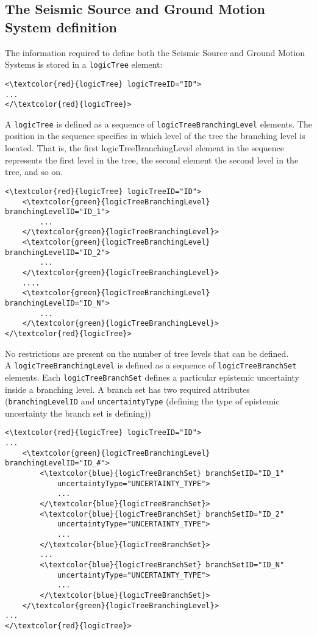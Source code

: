 \subsection{The Seismic Source and Ground Motion System definition}
The information required to define both the Seismic Source and Ground Motion Systems is stored in a \Verb+logicTree+ element: 
\begin{Verbatim}[frame=single, commandchars=\\\{\}]
<\textcolor{red}{logicTree} logicTreeID="ID">
...
</\textcolor{red}{logicTree}>
\end{Verbatim}
A \Verb+logicTree+ is defined as a sequence of \Verb+logicTreeBranchingLevel+ elements. The position in the sequence specifies in which level of the tree the branching level is located. That is, the first logicTreeBranchingLevel element in the sequence represents the first level in the tree, the second element the second level in the tree, and so on.
\begin{Verbatim}[frame=single, commandchars=\\\{\}]
<\textcolor{red}{logicTree} logicTreeID="ID">
	<\textcolor{green}{logicTreeBranchingLevel} branchingLevelID="ID_1">
		...
	</\textcolor{green}{logicTreeBranchingLevel}>
	<\textcolor{green}{logicTreeBranchingLevel} branchingLevelID="ID_2">
		...
	</\textcolor{green}{logicTreeBranchingLevel}>
	....
	<\textcolor{green}{logicTreeBranchingLevel} branchingLevelID="ID_N">
		...
	</\textcolor{green}{logicTreeBranchingLevel}>
</\textcolor{red}{logicTree}>
\end{Verbatim}
No restrictions are present on the number of tree levels that can be defined.\\
A \Verb+logicTreeBranchingLevel+ is defined as a sequence of \Verb+logicTreeBranchSet+ elements. Each \Verb+logicTreeBranchSet+ defines a particular epistemic uncertainty inside a branching level. A branch set has two required attributes (\Verb+branchingLevelID+ and \Verb+uncertaintyType+ (defining the type of epistemic uncertainty the branch set is defining))
\begin{Verbatim}[frame=single, commandchars=\\\{\}]
<\textcolor{red}{logicTree} logicTreeID="ID">
...
	<\textcolor{green}{logicTreeBranchingLevel} branchingLevelID="ID_#">
		<\textcolor{blue}{logicTreeBranchSet} branchSetID="ID_1"
			uncertaintyType="UNCERTAINTY_TYPE">
			...
		</\textcolor{blue}{logicTreeBranchSet}>
		<\textcolor{blue}{logicTreeBranchSet} branchSetID="ID_2"
			uncertaintyType="UNCERTAINTY_TYPE">
			...
		</\textcolor{blue}{logicTreeBranchSet}>
		...
		<\textcolor{blue}{logicTreeBranchSet} branchSetID="ID_N"
			uncertaintyType="UNCERTAINTY_TYPE">
			...
		</\textcolor{blue}{logicTreeBranchSet}>
	</\textcolor{green}{logicTreeBranchingLevel}>
...
</\textcolor{red}{logicTree}>
\end{Verbatim}
